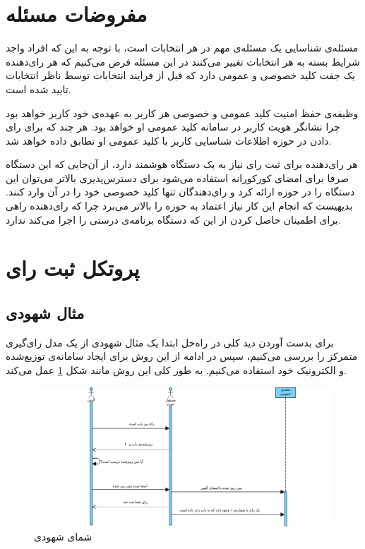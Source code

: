 \section{مفروضات مسئله}
مسئله‌ی شناسایی یک مسئله‌ی مهم در هر انتخابات است، با توجه به این که افراد واجد شرایط بسته به هر انتخابات تغییر می‌کنند در این مسئله فرض می‌کنیم که هر رای‌دهنده یک جفت کلید خصوصی و عمومی دارد که قبل از فرایند انتخابات توسط ناظر انتخابات تایید شده است. 
\par
وظیفه‌ی حفظ امنیت کلید عمومی و خصوصی هر کاربر به عهده‌ی خود کاربر خواهد بود چرا نشانگر هویت کاربر در سامانه‌ کلید عمومی او خواهد بود. هر چند که برای رای دادن در حوزه اطلاعات شناسایی کاربر با کلید عمومی او تطابق داده خواهد شد.
\par
هر رای‌دهنده برای ثبت رای نیاز به یک دستگاه هوشمند دارد، از آن‌جایی که این دستگاه صرفا برای امضای کورکورانه استفاده می‌شود برای دسترس‌پذیری بالاتر می‌توان این دستگاه را در حوزه ارائه کرد و رای‌دهندگان تنها کلید خصوصی خود را در آن وارد کنند. بدیهیست که انجام این کار نیاز اعتماد به حوزه را بالاتر می‌برد چرا که رای‌دهنده راهی برای اطمینان حاصل کردن از این که دستگاه برنامه‌ی درستی را اجرا می‌کند ندارد.

\section{پروتکل ثبت رای‌}
\subsection{مثال شهودی}
برای بدست آوردن دید کلی در راه‌حل ابتدا یک مثال شهودی از یک مدل رای‌گیری متمرکز را بررسی می‌کنیم،‌ سپس در ادامه از این روش برای ایجاد سامانه‌ی توزیع‌شده و الکترونیک خود استفاده می‌کنیم. به طور کلی این روش مانند شکل \ref{fig:pen} عمل می‌کند.
\begin{figure}[h!]
	\centering
	\includegraphics[width=1\linewidth]{penandpaper.png}
	\caption {شمای شهودی}
	\label{fig:pen}
\end{figure}


